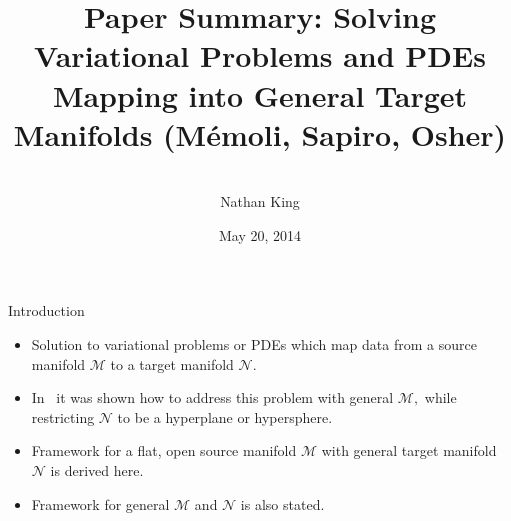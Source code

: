 \documentclass{beamer}
\title[Manifold Mapping] %
{Paper Summary: Solving Variational Problems and PDEs Mapping into General Target Manifolds (M\'{e}moli, Sapiro, Osher)}
\author[King] %
{\vspace{1cm}\\
Nathan King}
\institute[SFU] %
{
  Department of Mathematics\\
Simon Fraser University\\
 }
\date[May 20, 2014] %
{May 20, 2014}
\begin{document}
  
  
  
\begin{frame}
  \titlepage
\end{frame}





\begin{frame}{Introduction}
\begin{itemize}
\item Solution to variational problems or PDEs which map data from a source manifold $\mathcal{M}$ to a target manifold $\mathcal{N}.$
\item In~\cite{five} it was shown how to address this problem with general $\mathcal{M},$ while restricting $\mathcal{N}$ to be a hyperplane or hypersphere.
\item Framework for a flat, open source manifold $\mathcal{M}$ with general target manifold $\mathcal{N}$ is derived here.
\item Framework for general $\mathcal{M}$ and $\mathcal{N}$ is also stated.
\end{itemize}
\end{frame}
\end{document}
